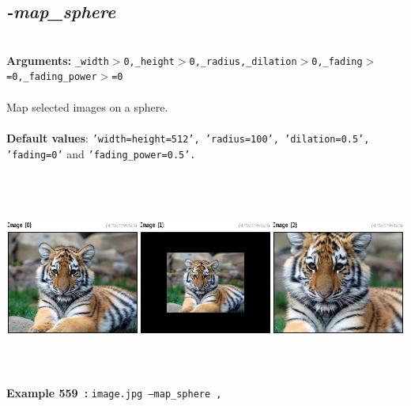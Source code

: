 \documentclass[a4paper,11pt,twoside]{book}
\begin{document}
\subsection{\emph{-map\_sphere} }\vspace*{-0.5em}
~\\\textbf{Arguments: } 
{\small \texttt{\_width$>$0,\_height$>$0,\_radius,\_dilation$>$0,\_fading$>$=0,\_fading\_power$>$=0}}\\~\\
Map selected images on a sphere.
~\\~\\\textbf{Default values}: {\small \texttt{'width=height=512', 'radius=100', 'dilation=0.5', 'fading=0'} and \texttt{'fading\_power=0.5'.}}
\begin{center}\includegraphics[keepaspectratio=true,height=7cm,width=\textwidth]{img/gmic_def559.jpg}\\
{\footnotesize \textbf{Example 559~:} \texttt{image.jpg --map\_sphere ,}}
\end{center}
\end{document}
